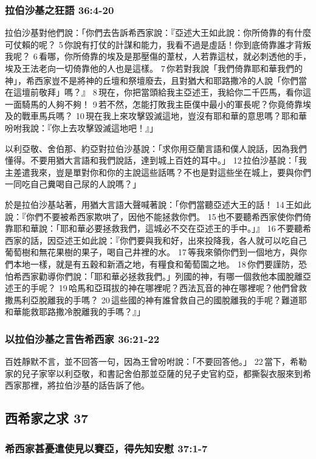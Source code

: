 \subsubsection{拉伯沙基之狂語 36:4-20}

拉伯沙基對他們說：「你們去告訴希西家說：『亞述大王如此說：你所倚靠的有什麼可仗賴的呢？ 5 你說有打仗的計謀和能力，我看不過是虛話！你到底倚靠誰才背叛我呢？ 6 看哪，你所倚靠的埃及是那壓傷的葦杖，人若靠這杖，就必刺透他的手，埃及王法老向一切倚靠他的人也是這樣。 7 你若對我說「我們倚靠耶和華我們的神」，希西家豈不是將神的丘壇和祭壇廢去，且對猶大和耶路撒冷的人說「你們當在這壇前敬拜」嗎？』 8 現在，你把當頭給我主亞述王，我給你二千匹馬，看你這一面騎馬的人夠不夠！ 9 若不然，怎能打敗我主臣僕中最小的軍長呢？你竟倚靠埃及的戰車馬兵嗎？ 10 現在我上來攻擊毀滅這地，豈沒有耶和華的意思嗎？耶和華吩咐我說：『你上去攻擊毀滅這地吧！』」

以利亞敬、舍伯那、約亞對拉伯沙基說：「求你用亞蘭言語和僕人說話，因為我們懂得。不要用猶大言語和我們說話，達到城上百姓的耳中。」 12 拉伯沙基說：「我主差遣我來，豈是單對你和你的主說這些話嗎？不也是對這些坐在城上，要與你們一同吃自己糞喝自己尿的人說嗎？」

於是拉伯沙基站著，用猶大言語大聲喊著說：「你們當聽亞述大王的話！ 14 王如此說：『你們不要被希西家欺哄了，因他不能拯救你們。 15 也不要聽希西家使你們倚靠耶和華說：「耶和華必要拯救我們，這城必不交在亞述王的手中。」』 16 不要聽希西家的話，因亞述王如此說：『你們要與我和好，出來投降我，各人就可以吃自己葡萄樹和無花果樹的果子，喝自己井裡的水。 17 等我來領你們到一個地方，與你們本地一樣，就是有五穀和新酒之地，有糧食和葡萄園之地。 18 你們要謹防，恐怕希西家勸導你們說：「耶和華必拯救我們。」列國的神，有哪一個救他本國脫離亞述王的手呢？ 19 哈馬和亞珥拔的神在哪裡呢？西法瓦音的神在哪裡呢？他們曾救撒馬利亞脫離我的手嗎？ 20 這些國的神有誰曾救自己的國脫離我的手呢？難道耶和華能救耶路撒冷脫離我的手嗎？』」

\subsubsection{以拉伯沙基之言告希西家 36:21-22}
百姓靜默不言，並不回答一句，因為王曾吩咐說：「不要回答他。」 22 當下，希勒家的兒子家宰以利亞敬，和書記舍伯那並亞薩的兒子史官約亞，都撕裂衣服來到希西家那裡，將拉伯沙基的話告訴了他。

\subsection{西希家之求 37}
\subsubsection{希西家甚憂遣使見以賽亞，得先知安慰 37:1-7}

